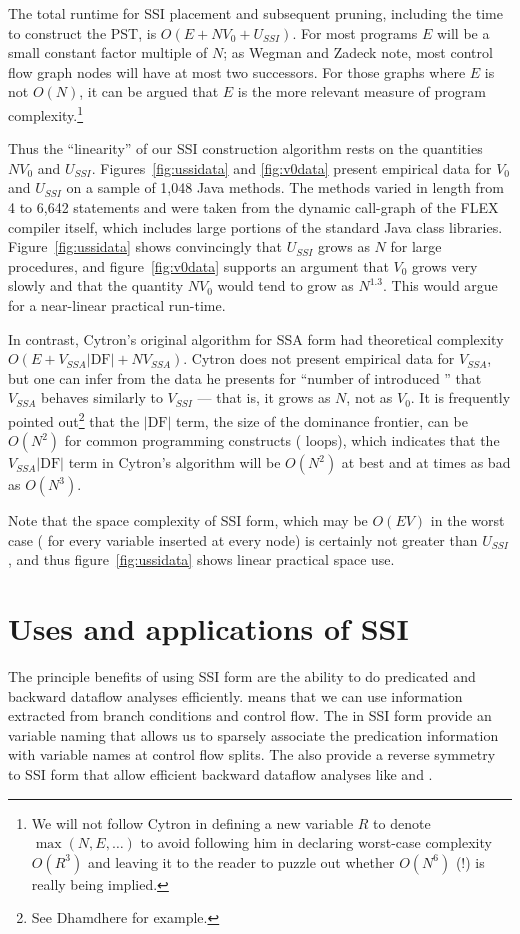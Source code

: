 \documentclass[12pt,titlepage,twoside]{article}
\let\oldsection\section
\renewcommand{\section}{\setcounter{figure}{0}\setcounter{table}{0}\oldsection}
\begin{document}
The total runtime for SSI placement and subsequent pruning, including
the time to construct the PST, is $O(E + N V_0 + U_{SSI})$.  For most
programs $E$ will be a small constant factor multiple of $N$; as
Wegman and Zadeck \cite{wegman91:scc} note, most control flow graph
nodes will have at most two successors.  For those graphs where $E$ is
not $O(N)$, it can be argued that $E$ is the more relevant measure of
program complexity.\footnote{We will not follow Cytron \cite{cytron91:ssa} in
defining a new variable $R$ to denote $\max(N,E,\ldots)$ to avoid
following him in declaring worst-case complexity $O(R^3)$ and leaving
it to the reader to puzzle out whether $O(N^6)$ (!) is really being implied.}

Thus the ``linearity'' of our SSI construction algorithm rests on the
quantities $N V_0$ and $U_{SSI}$.  Figures~\ref{fig:ussidata} and
\ref{fig:v0data} present empirical data for $V_0$ and $U_{SSI}$ on a
sample of 1,048 Java methods.  The methods varied in length from 4
to 6,642 statements and were taken from the dynamic call-graph of the
FLEX compiler itself, which includes large portions of the standard
Java class libraries.  Figure~\ref{fig:ussidata} shows convincingly
that $U_{SSI}$ grows as $N$ for large procedures, and
figure~\ref{fig:v0data} supports an argument that $V_0$ grows very
slowly and that the quantity $N V_0$ would tend to grow as $N^{1.3}$.
This would argue for a near-linear practical run-time.

In contrast, Cytron's original algorithm for SSA form had theoretical
complexity $O(E + V_{SSA} |\text{DF}| + N V_{SSA})$.  Cytron does not
present empirical data for $V_{SSA}$, but one can infer from the data
he presents for ``number of introduced '' that
$V_{SSA}$ behaves similarly to $V_{SSI}$ --- that is, it grows as $N$,
not as $V_0$.  It is frequently pointed out\footnote{See Dhamdhere
\cite{dhamdhere92:large} for example.} that the $|\text{DF}|$
term, the size of the dominance frontier, can be $O(N^2)$ for common
programming constructs ( loops), which indicates that
the $V_{SSA} |\text{DF}|$ term in Cytron's algorithm will be $O(N^2)$
at best and at times as bad as $O(N^3)$.

Note that the space complexity of SSI form, which may be $O(EV)$ in
the worst case ( for every variable inserted at
every node) is certainly not greater than $U_{SSI}$, and thus
figure~\ref{fig:ussidata} shows linear practical space use.

\section{Uses and applications of SSI}
The principle benefits of using SSI form are the ability to do
predicated and backward dataflow analyses efficiently.
 means that we can use information
extracted from branch conditions and control flow.  The
 in SSI form provide an variable naming that
allows us to sparsely associate the predication information with
variable names at control flow splits.  The  also
provide a reverse symmetry to SSI form that allow efficient backward
dataflow analyses like  and
.
\end{document}
